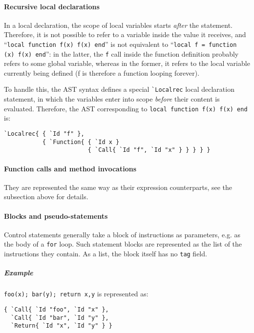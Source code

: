 \paragraph{Recursive local declarations}
In a local declaration, the scope of local variables starts {\em
  after} the statement. Therefore, it is not possible to refer to a
variable inside the value it receives, and
``{\tt local function f(x) f(x) end}'' is not equivalent to
``{\tt local f = function (x) f(x) end}'': in the latter, the \verb|f|
call inside the function definition probably refers to some global
variable, whereas in the former, it refers to the local variable
currently being defined (f is therefore a function looping forever).

To handle this, the AST syntax defines a special \verb|`Localrec|
local declaration statement, in which the variables enter into scope
{\em before} their content is evaluated. Therefore, the AST
corresponding to {\tt local function f(x) f(x) end} is:
\begin{verbatim}
`Localrec{ { `Id "f" },
           { `Function{ { `Id x }
                        { `Call{ `Id "f", `Id "x" } } } } }
\end{verbatim}



\paragraph{Function calls and method invocations}
They are represented the same way as their expression counterparts,
see the subsection above for details.

\paragraph{Blocks and pseudo-statements}
Control statements generally take a block of instructions as
parameters, e.g. as the body of a \verb|for| loop. Such statement
blocks are represented as the list of the instructions they
contain. As a list, the block itself has no \verb|tag| field.

\subparagraph{Example}
\verb|foo(x); bar(y); return x,y| is represented as:
\begin{verbatim}
{ `Call{ `Id "foo", `Id "x" },
  `Call{ `Id "bar", `Id "y" },
  `Return{ `Id "x", `Id "y" } }
\end{verbatim}

